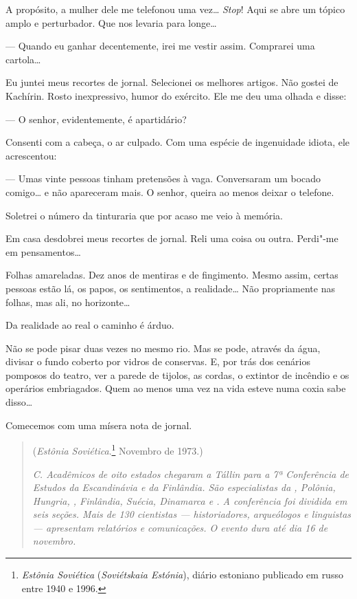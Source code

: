 A propósito, a mulher dele me telefonou uma vez\ldots{} \emph{Stop}! Aqui se
abre um tópico amplo e perturbador. Que nos levaria para longe\ldots{}

--- Quando eu ganhar decentemente, irei me vestir assim. Comprarei uma
cartola\ldots{}

Eu juntei meus recortes de jornal. Selecionei os melhores artigos. Não
gostei de Kachírin. Rosto inexpressivo, humor do exército. Ele me deu
uma olhada e disse:

--- O senhor, evidentemente, é apartidário?

Consenti com a cabeça, o ar culpado. Com uma espécie de ingenuidade
idiota, ele acrescentou:

--- Umas vinte pessoas tinham pretensões à vaga. Conversaram um bocado
comigo\ldots{} e não apareceram mais. O senhor, queira ao menos deixar o
telefone.

Soletrei o número da tinturaria que por acaso me veio à memória.

Em casa desdobrei meus recortes de jornal. Reli uma coisa ou outra.
Perdi"-me em pensamentos\ldots{}

Folhas amareladas. Dez anos de mentiras e de fingimento. Mesmo assim,
certas pessoas estão lá, os papos, os sentimentos, a realidade\ldots{} Não
propriamente nas folhas, mas ali, no horizonte\ldots{}

Da realidade ao real o caminho é árduo.

Não se pode pisar duas vezes no mesmo rio. Mas se pode, através da água,\label{ref0}
divisar o fundo coberto por vidros de conservas. E, por trás dos
cenários pomposos do teatro, ver a parede de tijolos, as cordas, o
extintor de incêndio e os operários embriagados. Quem ao menos uma vez
na vida esteve numa coxia sabe disso\ldots{}

Comecemos com uma mísera nota de jornal.

\movetooddpage
\begin{center}
{}
\end{center}


\begin{quotation}
\begin{flushright}
(\emph{Estônia Soviética}.\footnote{\emph{Estônia Soviética}
  (\emph{Soviétskaia Estónia}), diário estoniano publicado em russo
  en­tre 1940 e 1996.} Novembro de 1973.)\\
\end{flushright}
\vspace{4pt}
\noindent\emph{C. Acadêmicos de oito estados chegaram a
Tállin para a 7ª Conferência de Estudos da Escandinávia e da Finlândia.
São especialistas da , Polônia, Hungria, , Finlândia, Suécia,
Dinamarca e . A conferência foi dividida em seis seções. Mais de 130
cientistas --- historiadores, arqueólogos e linguistas --- apresentam
relatórios e comunicações. O evento dura até dia 16 de novembro.}
\end{quotation}

